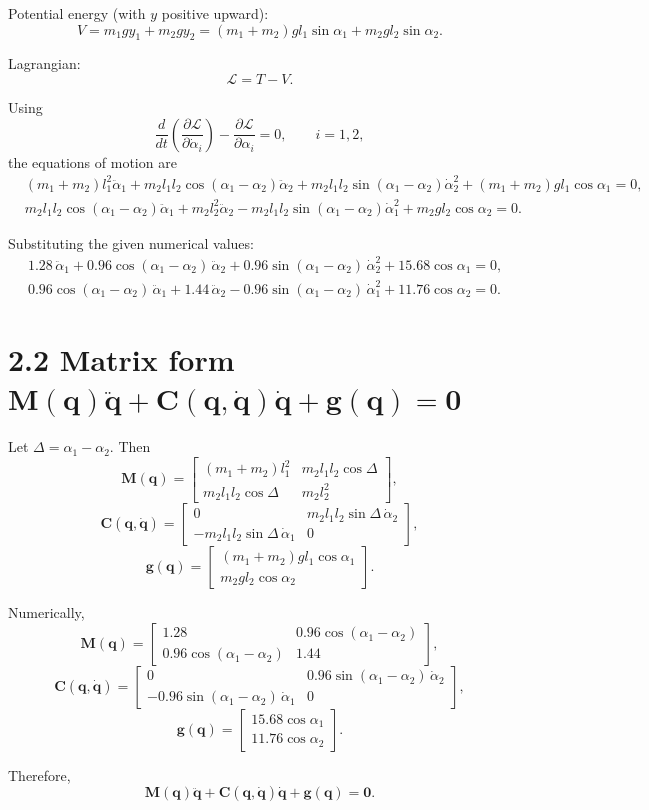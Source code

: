 \documentclass[12pt]{article}
\begin{document}
Potential energy (with $y$ positive upward):
\[
V = m_1gy_1 + m_2gy_2
= (m_1+m_2)gl_1\sin\alpha_1 + m_2gl_2\sin\alpha_2.
\]

Lagrangian:
\[
\mathcal L = T - V.
\]

Using
\[
\frac{d}{dt}\left(\frac{\partial\mathcal L}{\partial \dot\alpha_i}\right)
- \frac{\partial\mathcal L}{\partial \alpha_i} = 0,
\qquad i=1,2,
\]
the equations of motion are
\begin{align*}
&(m_1+m_2)l_1^2\ddot\alpha_1
+ m_2l_1l_2\cos(\alpha_1-\alpha_2)\ddot\alpha_2
+ m_2l_1l_2\sin(\alpha_1-\alpha_2)\dot\alpha_2^2
+ (m_1+m_2)gl_1\cos\alpha_1 = 0,\\
&m_2l_1l_2\cos(\alpha_1-\alpha_2)\ddot\alpha_1
+ m_2l_2^2\ddot\alpha_2
- m_2l_1l_2\sin(\alpha_1-\alpha_2)\dot\alpha_1^2
+ m_2gl_2\cos\alpha_2 = 0.
\end{align*}

Substituting the given numerical values:
\begin{align*}
&1.28\,\ddot\alpha_1 + 0.96\cos(\alpha_1-\alpha_2)\,\ddot\alpha_2
+ 0.96\sin(\alpha_1-\alpha_2)\,\dot\alpha_2^2
+ 15.68\cos\alpha_1 = 0,\\
&0.96\cos(\alpha_1-\alpha_2)\,\ddot\alpha_1 + 1.44\,\ddot\alpha_2
- 0.96\sin(\alpha_1-\alpha_2)\,\dot\alpha_1^2
+ 11.76\cos\alpha_2 = 0.
\end{align*}

\section*{2.2 Matrix form $\bm M(\bm q)\ddot{\bm q}+\bm C(\bm q,\dot{\bm q})\dot{\bm q}+\bm g(\bm q)=\bm 0$}
Let $\Delta = \alpha_1-\alpha_2$. Then
\[
\bm M(\bm q)=
\begin{bmatrix}
(m_1+m_2)l_1^2 & m_2l_1l_2\cos\Delta \\
m_2l_1l_2\cos\Delta & m_2l_2^2
\end{bmatrix},
\]
\[
\bm C(\bm q,\dot{\bm q})=
\begin{bmatrix}
0 & m_2l_1l_2\sin\Delta\,\dot\alpha_2 \\
-m_2l_1l_2\sin\Delta\,\dot\alpha_1 & 0
\end{bmatrix},
\]
\[
\bm g(\bm q)=
\begin{bmatrix}
(m_1+m_2)gl_1\cos\alpha_1 \\
m_2gl_2\cos\alpha_2
\end{bmatrix}.
\]

Numerically,
\[
\bm M(\bm q)=
\begin{bmatrix}
1.28 & 0.96\cos(\alpha_1-\alpha_2) \\
0.96\cos(\alpha_1-\alpha_2) & 1.44
\end{bmatrix},
\]
\[
\bm C(\bm q,\dot{\bm q})=
\begin{bmatrix}
0 & 0.96\sin(\alpha_1-\alpha_2)\,\dot\alpha_2 \\
-0.96\sin(\alpha_1-\alpha_2)\,\dot\alpha_1 & 0
\end{bmatrix},
\]
\[
\bm g(\bm q)=
\begin{bmatrix}
15.68\cos\alpha_1 \\
11.76\cos\alpha_2
\end{bmatrix}.
\]

Therefore,
\[
\bm M(\bm q)\ddot{\bm q}+\bm C(\bm q,\dot{\bm q})\dot{\bm q}+\bm g(\bm q)=\bm 0.
\]
\end{document}

